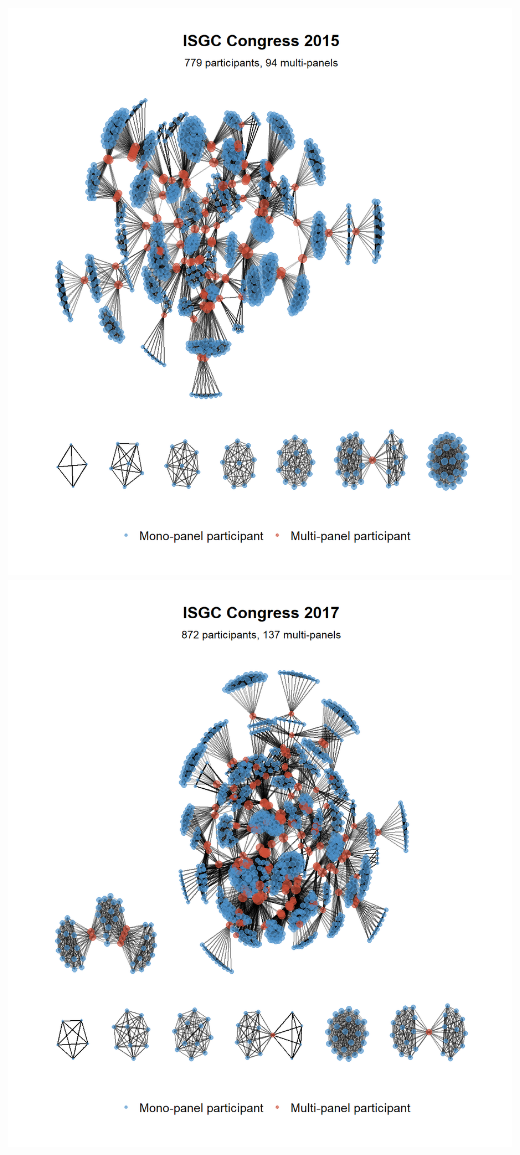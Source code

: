 \documentclass[
]{article}
\begin{document}
\includegraphics[width=16.67in]{plots/congres-isgc2015-1mode}
\includegraphics[width=16.67in]{plots/congres-isgc2017-1mode}
\end{document}
